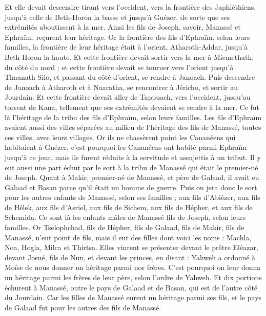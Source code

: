 \begin{multicols}{2}
Et elle devait descendre tirant vers l'occident, vers la frontière des Japhléthiens, jusqu'à celle de Beth-Horon la basse et jusqu'à Guézer, de sorte que ses extrémités aboutissent à la mer.
Ainsi les fils de Joseph, savoir, Manassé et Ephraïm, reçurent leur héritage.
Or la frontière des fils d'Ephraïm, selon leurs familles, la frontière de leur héritage était à l'orient, Atharoth-Addar, jusqu'à Beth-Horon la haute.
Et cette frontière devait sortir vers la mer à Micmethath, du côté du nord ; et cette frontière devait se tourner vers l'orient jusqu'à Thaanath-Silo, et passant du côté d'orient, se rendre à Janoach.
Puis descendre de Janoach à Atharoth et à Naaratha, se rencontrer à Jéricho, et sortir au Jourdain.
Et cette frontière devait aller de Tappuach, vers l'occident, jusqu'au torrent de Kana, tellement que ses extrémités devaient se rendre à la mer. Ce fut là l'héritage de la tribu des fils d'Ephraïm, selon leurs familles.
Les fils d'Ephraïm avaient aussi des villes séparées au milieu de l'héritage des fils de Manassé, toutes ces villes, avec leurs villages.
Or ils ne chassèrent point les Cananéens qui habitaient à Guézer, c'est pourquoi les Cananéens ont habité parmi Ephraïm jusqu'à ce jour, mais ils furent réduits à la servitude et assujettis à un tribut.
\VerseOne{}Il y eut aussi une part échut par le sort à la tribu de Manassé qui était le premier-né de Joseph. Quant à Makir, premier-né de Manassé, et père de Galaad, il avait eu Galaad et Basan parce qu'il était un homme de guerre.
Puis on jeta donc le sort pour les autres enfants de Manassé, selon ses familles ; aux fils d'Abiézer, aux fils de Hélek, aux fils d'Asriel, aux fils de Sichem, aux fils de Hépher, et aux fils de Schemida. Ce sont là les enfants mâles de Manassé fils de Joseph, selon leurs familles.
Or Tselophchad, fils de Hépher, fils de Galaad, fils de Makir, fils de Manassé, n'eut point de fils, mais il eut des filles dont voici les noms : Machla, Noa, Hogla, Milca et Thirtsa.
Elles vinrent se présenter devant le prêtre Eléazar, devant Josué, fils de Nun, et devant les princes, en disant : Yahweh a ordonné à Moïse de nous donner un héritage parmi nos frères. C'est pourquoi on leur donna un héritage parmi les frères de leur père, selon l'ordre de Yahweh.
Et dix portions échurent à Manassé, outre le pays de Galaad et de Basan, qui est de l'autre côté du Jourdain.
Car les filles de Manassé eurent un héritage parmi ses fils, et le pays de Galaad fut pour les autres des fils de Manassé.

\end{multicols}
